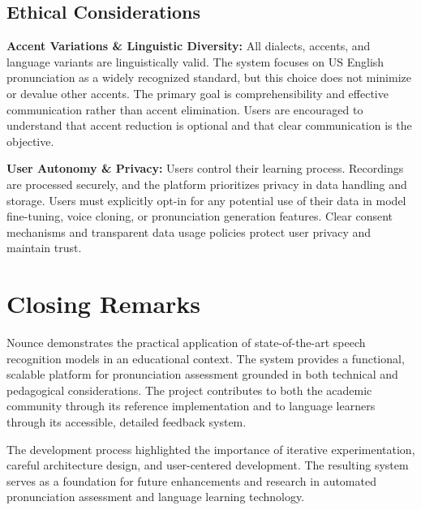 \documentclass[a4paper,12pt]{report}
\begin{document}
\subsection{Ethical Considerations}

\textbf{Accent Variations \& Linguistic Diversity:} All dialects, accents, and language variants are linguistically valid. The system focuses on US English pronunciation as a widely recognized standard, but this choice does not minimize or devalue other accents. The primary goal is comprehensibility and effective communication rather than accent elimination. Users are encouraged to understand that accent reduction is optional and that clear communication is the objective.

\textbf{User Autonomy \& Privacy:} Users control their learning process. Recordings are processed securely, and the platform prioritizes privacy in data handling and storage. Users must explicitly opt-in for any potential use of their data in model fine-tuning, voice cloning, or pronunciation generation features. Clear consent mechanisms and transparent data usage policies protect user privacy and maintain trust.

\section{Closing Remarks}

Nounce demonstrates the practical application of state-of-the-art speech recognition models in an educational context. The system provides a functional, scalable platform for pronunciation assessment grounded in both technical and pedagogical considerations. The project contributes to both the academic community through its reference implementation and to language learners through its accessible, detailed feedback system.

The development process highlighted the importance of iterative experimentation, careful architecture design, and user-centered development. The resulting system serves as a foundation for future enhancements and research in automated pronunciation assessment and language learning technology.



\end{document}
